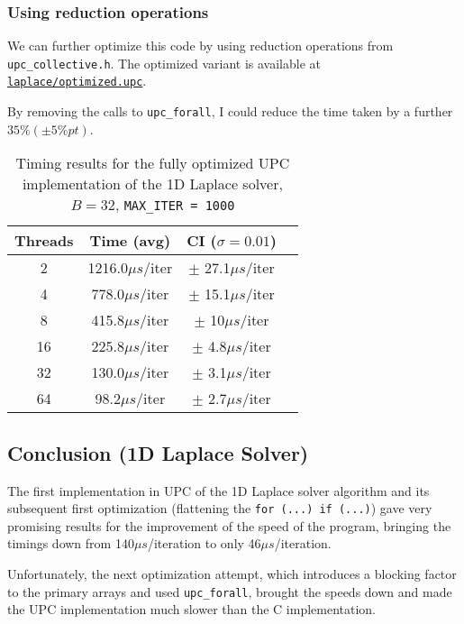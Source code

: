 \documentclass[12pt]{article}
\newcommand{\us}[0]{${\mu}s$}
\begin{document}
\subsubsection{Using reduction operations}

We can further optimize this code by using reduction operations from \texttt{upc\_collective.h}.
The optimized variant is available at \texttt{\href{https://github.com/adri326/pc40-upc/tree/main/laplace/ex5.upc}{laplace/optimized.upc}}.

By removing the calls to \texttt{upc\_forall}, I could reduce the time taken by a further $35\% (\pm 5\%pt)$.


\begin{table}[ht]
  \centering\begin{tabular}{|c|c|c|c|}
    \hline
    Threads & Time (avg) & CI ($\sigma=0.01$) \\
    \hline
    2 & 1216.0\us/iter & $\pm$ 27.1\us/iter \\
    4 & 778.0\us/iter & $\pm$ 15.1\us/iter \\
    8 & 415.8\us/iter & $\pm$ 10\us/iter \\
    16 & 225.8\us/iter & $\pm$ 4.8\us/iter \\
    32 & 130.0\us/iter & $\pm$ 3.1\us/iter \\
    64 & 98.2\us/iter & $\pm$ 2.7\us/iter \\
    \hline
  \end{tabular}
  \caption{Timing results for the fully optimized UPC implementation of the 1D Laplace solver, $B = 32$, \texttt{MAX\_ITER = 1000}}
  \label{tab:laplace6opt}
\end{table}

\subsection{Conclusion (1D Laplace Solver)}

The first implementation in UPC of the 1D Laplace solver algorithm and its subsequent first optimization (flattening the \texttt{for (...) if (...)}) gave very promising results for the improvement of the speed of the program, bringing the timings down from 140\us/iteration to only 46\us/iteration.

Unfortunately, the next optimization attempt, which introduces a blocking factor to the primary arrays and used \texttt{upc\_forall}, brought the speeds down and made the UPC implementation much slower than the C implementation.
\end{document}
